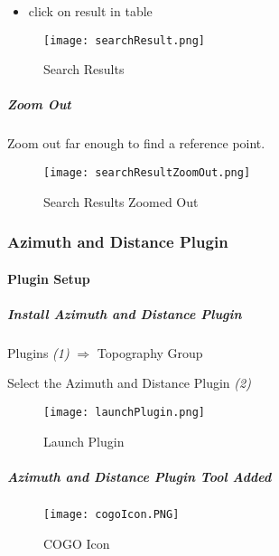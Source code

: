 \begin{itemize}

\item click on result in table

\end{itemize}
\begin{figure}[H]
\centering
    \texttt{[image: searchResult.png]}
\vspace{-.1in}

\caption{Search Results}
\end{figure}

\clearpage


\subparagraph*{Zoom Out}

\noindent Zoom out far enough to find a reference point.
\begin{figure}[H]
\centering
    \texttt{[image: searchResultZoomOut.png]}
\vspace{-.1in}

\caption{Search Results Zoomed Out}
\end{figure}
\clearpage

 
\subsubsection{Azimuth and Distance Plugin} 
\paragraph{Plugin Setup}
\vspace{.1in}

\subparagraph{Install Azimuth and Distance Plugin}

\noindent Plugins \emph{(1)} $\Rightarrow$ Topography Group
\vspace{.1in}

\noindent Select the Azimuth and Distance Plugin \emph{(2)}
\begin{figure}[H] %
\centering
    \texttt{[image: launchPlugin.png]}
\vspace{-.3in}

\caption{Launch Plugin}
\end{figure}
\vspace{.1in}

\subparagraph{Azimuth and Distance Plugin Tool Added}
\begin{figure}[H]
\centering
     \texttt{[image: cogoIcon.PNG]}

\caption{COGO Icon}
\end{figure}

